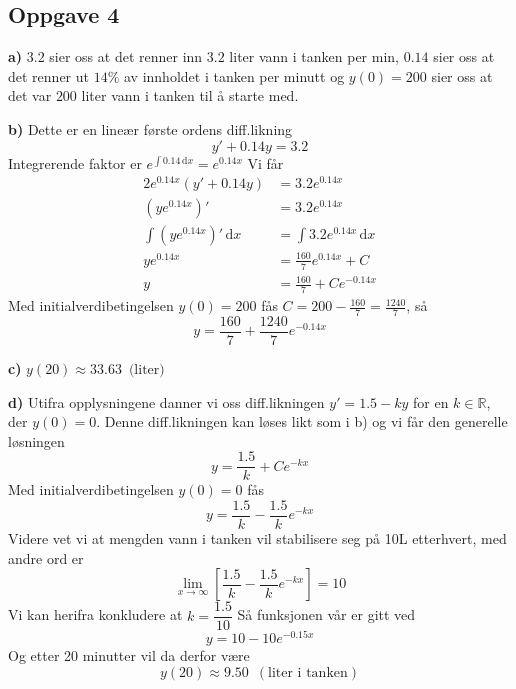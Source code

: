\subsection{Oppgave 4}
\textbf{a)} $3.2$ sier oss at det renner inn $3.2$ liter vann i tanken per min, $0.14$ sier oss at det renner ut $14\%$ av innholdet i tanken per minutt og $y(0)=200$ sier oss at det var $200$ liter vann i tanken til å starte med. \newline

\textbf{b)} Dette er en lineær første ordens diff.likning $$y'+0.14y=3.2$$ Integrerende faktor er $e^{\int 0.14 \, \text{d}x} = e^{0.14x}$ Vi får 
\begin{alignat*}{2}
	e^{0.14x}\left(y'+0.14y\right) &= 3.2e^{0.14x} \\
	\left(ye^{0.14x} \right)' &= 3.2e^{0.14x} \\
	\int \left(ye^{0.14x} \right)' \, \text{d}x &= \int 3.2e^{0.14x} \, \text{d}x \\
	ye^{0.14x} &= \frac{160}{7}e^{0.14x} + C \\
	y &= \frac{160}{7} + Ce^{-0.14x}
\end{alignat*}
Med initialverdibetingelsen $y(0)=200$ fås $C=200-\frac{160}{7} = \frac{1240}{7}$, så $$y=\frac{160}{7} + \frac{1240}{7}e^{-0.14x}$$

\textbf{c)} $y(20) \approx 33.63 \enspace \text{(liter)}$ \newline

\textbf{d)} Utifra opplysningene danner vi oss diff.likningen $y'=1.5-ky$ for en $k \in \mathbb{R}$, der $y(0)=0$. Denne diff.likningen kan løses likt som i b) og vi får den generelle løsningen $$y=\frac{1.5}{k} + Ce^{-kx}$$ Med initialverdibetingelsen $y(0)=0$ fås $$y=\frac{1.5}{k} - \frac{1.5}{k}e^{-kx}$$ Videre vet vi at mengden vann i tanken vil stabilisere seg på 10L etterhvert, med andre ord er $$\lim_{x \to \infty} \left[\frac{1.5}{k} - \frac{1.5}{k}e^{-kx}\right] = 10$$ Vi kan herifra konkludere at $k=\dfrac{1.5}{10}$ Så funksjonen vår er gitt ved $$y=10-10e^{-0.15x}$$ Og etter 20 minutter vil da derfor være $$y(20)\approx 9.50 \enspace (\text{liter i tanken})$$
	

